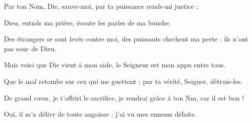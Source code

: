\item Par ton Nom, Die, sauve-moi,\psstar{} par ta puissance rends-mi justice ;
\item Dieu, entnds ma prière,\psstar{} écoute les parles de ma bouche.
\item Des étrangers se sont levés contre moi,\pscross{} des puissants chrchent ma perte :\psstar{} ils n’ont pas souc de Dieu.
\item Mais voici que Die vient à mon aide,\psstar{} le Seigneur est mon appu entre tous.
\item Que le mal retombe sur cex qui me guettent ;\psstar{} par ta vérité, Seigner, détruis-les.
\item De grand cœur, je t’offriri le sacrifice,\psstar{} je rendrai grâce à ton Nm, car il est bon !
\item Oui, il m’a délivr de toute angoisse :\psstar{} j’ai vu mes ennems défaits.